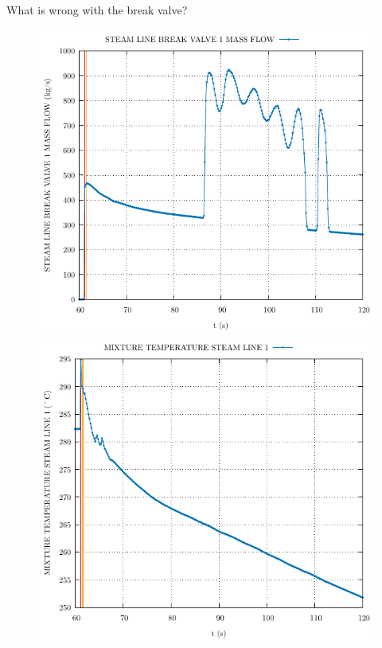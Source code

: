 \begin{frame}{What is wrong with the break valve?}
	\begin{figure}
		\centering
		\begin{minipage}{.5\textwidth}
			\centering
			\includegraphics[width=\linewidth]{./graphs/STEAM LINE BREAK VALVE 1 MASS FLOW.pdf}
		\end{minipage}%
		\begin{minipage}{.5\textwidth}
			\centering
			\includegraphics[width=\linewidth]{./graphs/MIXTURE TEMPERATURE STEAM LINE 1.pdf}

\end{minipage}
\end{figure}
\end{frame}
